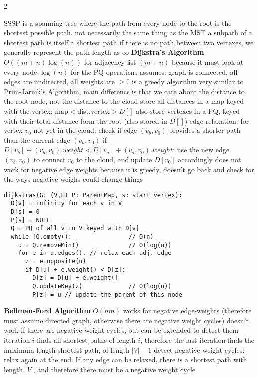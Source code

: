 \documentclass{article}
\def \columncount {2}
\begin{document}
\begin{multicols*}{\columncount}
\begin{outline}[longenum]
  \1 SSSP is a spanning tree where the path from every node to the root is the shortest possible path.
    \2 not necessarily the same thing as the MST
  \1 a subpath of a shortest path is itself a shortest path
  \1 if there is no path between two vertexes, we generally represent the path length as $\infty$
  \1 \textbf{Dijkstra's Algorithm}
    \2 $O( (m+n)\log(n))$ for adjacency list
      \3 $(m+n)$ because it must look at every node
      \3 $\log(n)$ for the PQ operations
    \2 assumes: graph is connected, all edges are undirected, all weights are $\geq 0$
    \2 is a greedy algorithm
    \2 very similar to Prim-Jarnik's Algorithm, main difference is that we care about the distance to the root node, not the distance to the cloud
    \2 store all distances in a map keyed with the vertex; 
    map$<$dist,vertex$>D[]$
    \2 also store vertexes in a PQ, keyed with their total distance form the root (also stored in $D[]$)
    \2 edge relaxation: 
      \3 for vertex $v_0$ not yet in the cloud: check if edge $(v_b,v_0)$ provides a shorter path than the current edge $(v_a,v_0)$
      \3 if $D[v_b] + (v_b,v_0).weight <  D[v_a] + (v_a,v_0).weight$: use the new edge $(v_b,v_0)$ to connect $v_0$ to the cloud, and update $D[v_0]$ accordingly
    \2 does not work for negative edge weights because it is greedy, doesn't go back and check for the ways negative weighs could change things
\0 \vspace{-0.23cm}
\begin{lstlisting}
dijkstras(G: (V,E) P: ParentMap, s: start vertex):
  D[v] = infinity for each v in V
  D[s] = 0
  P[s] = NULL
  Q = PQ of all v in V keyed with D[v]
  while !Q.empty():                // O(n)
    u = Q.removeMin()              // O(log(n))
    for e in u.edges(): // relax each adj. edge
      z = e.opposite(u)
      if D[u] + e.weight() < D[z]:
        D[z] = D[u] + e.weight()
        Q.updateKey(z)             // O(log(n))
        P[z] = u // update the parent of this node
\end{lstlisting} \vspace{-0.23cm}
  \1 \textbf{Bellman-Ford Algorithm}
    \2 $O(nm)$
    \2 works for negative edge-weights (therefore must assume directed graph, otherwise there are negative weight cycles)
    \2 doesn't work if there are negative weight cycles, but can be extended to detect them
    \2 iteration $i$ finds all shortest paths of length $i$, therefore the last iteration finds the maximum length shortest-path, of length $|V|-1$
      \3 detect negative weight cycles: relax again at the end. If any edge can be relaxed, there is a shortest path with length $|V|$, and therefore there must be a negative weight cycle

\end{outline}
\end{multicols*}
\end{document}
